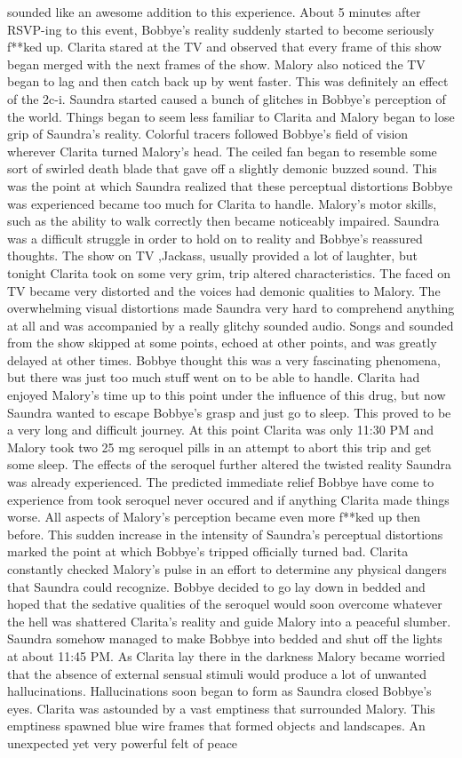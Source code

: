 \documentclass[12pt]{book}
\begin{document}
sounded like an awesome addition to this experience. About 5 minutes after RSVP-ing to this event, Bobbye's reality suddenly started to become seriously f**ked up. Clarita stared at the TV and observed that every frame of this show began merged with the next frames of the show. Malory also noticed the TV began to lag and then catch back up by went faster. This was definitely an effect of the 2c-i. Saundra started caused a bunch of glitches in Bobbye's perception of the world. Things began to seem less familiar to Clarita and Malory began to lose grip of Saundra's reality. Colorful tracers followed Bobbye's field of vision wherever Clarita turned Malory's head. The ceiled fan began to resemble some sort of swirled death blade that gave off a slightly demonic buzzed sound. This was the point at which Saundra realized that these perceptual distortions Bobbye was experienced became too much for Clarita to handle. Malory's motor skills, such as the ability to walk correctly then became noticeably impaired. Saundra was a difficult struggle in order to hold on to reality and Bobbye's reassured thoughts. The show on TV ,Jackass, usually provided a lot of laughter, but tonight Clarita took on some very grim, trip altered characteristics. The faced on TV became very distorted and the voices had demonic qualities to Malory. The overwhelming visual distortions made Saundra very hard to comprehend anything at all and was accompanied by a really glitchy sounded audio. Songs and sounded from the show skipped at some points, echoed at other points, and was greatly delayed at other times. Bobbye thought this was a very fascinating phenomena, but there was just too much stuff went on to be able to handle. Clarita had enjoyed Malory's time up to this point under the influence of this drug, but now Saundra wanted to escape Bobbye's grasp and just go to sleep. This proved to be a very long and difficult journey. At this point Clarita was only 11:30 PM and Malory took two 25 mg seroquel pills in an attempt to abort this trip and get some sleep. The effects of the seroquel further altered the twisted reality Saundra was already experienced. The predicted immediate relief Bobbye have come to experience from took seroquel never occured and if anything Clarita made things worse. All aspects of Malory's perception became even more f**ked up then before. This sudden increase in the intensity of Saundra's perceptual distortions marked the point at which Bobbye's tripped officially turned bad. Clarita constantly checked Malory's pulse in an effort to determine any physical dangers that Saundra could recognize. Bobbye decided to go lay down in bedded and hoped that the sedative qualities of the seroquel would soon overcome whatever the hell was shattered Clarita's reality and guide Malory into a peaceful slumber. Saundra somehow managed to make Bobbye into bedded and shut off the lights at about 11:45 PM. As Clarita lay there in the darkness Malory became worried that the absence of external sensual stimuli would produce a lot of unwanted hallucinations. Hallucinations soon began to form as Saundra closed Bobbye's eyes. Clarita was astounded by a vast emptiness that surrounded Malory. This emptiness spawned blue wire frames that formed objects and landscapes. An unexpected yet very powerful felt of peace 
\end{document}
